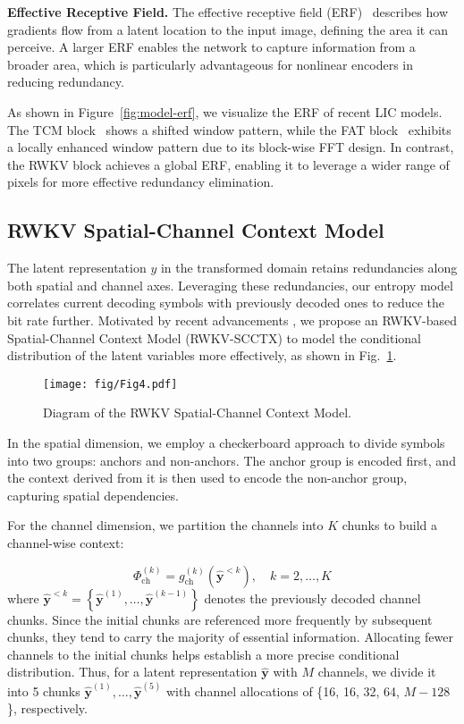 \noindent\textbf{Effective Receptive Field.} The effective receptive field (ERF)~\cite{Luo.2016.ERF} describes how gradients flow from a latent location to the input image, defining the area it can perceive. A larger ERF enables the network to capture information from a broader area, which is particularly advantageous for nonlinear encoders in reducing redundancy. 

As shown in Figure~\ref{fig:model-erf}, we visualize the ERF of recent LIC models. The TCM block~\cite{Liu.2023.TCM} shows a shifted window pattern, while the FAT block~\cite{Li.2023.FAT} exhibits a locally enhanced window pattern due to its block-wise FFT design. In contrast, the RWKV block achieves a global ERF, enabling it to leverage a wider range of pixels for more effective redundancy elimination.

\subsection{RWKV Spatial-Channel Context Model}

The latent representation \( y \) in the transformed domain retains redundancies along both spatial and channel axes. Leveraging these redundancies, our entropy model correlates current decoding symbols with previously decoded ones to reduce the bit rate further. Motivated by recent advancements \cite{He.2022.ELIC, Liu.2023.TCM}, we propose an RWKV-based Spatial-Channel Context Model (RWKV-SCCTX) to model the conditional distribution of the latent variables more effectively, as shown in Fig.~\ref{fig:entropy-model}.

\begin{figure}[t]
  \centering
  \texttt{[image: fig/Fig4.pdf]}
  \caption{Diagram of the RWKV Spatial-Channel Context Model.} 
  \label{fig:entropy-model}
\end{figure}

In the spatial dimension, we employ a checkerboard approach to divide symbols into two groups: anchors and non-anchors. The anchor group is encoded first, and the context derived from it is then used to encode the non-anchor group, capturing spatial dependencies.

For the channel dimension, we partition the channels into \( K \) chunks to build a channel-wise context:

\begin{equation}
   \Phi_{\mathrm{ch}}^{(k)} = g_{\mathrm{ch}}^{(k)}\left(\hat{\boldsymbol{y}}^{<k}\right), \quad k=2, \ldots, K 
\end{equation}
where \( \hat{\boldsymbol{y}}^{<k} = \left\{\hat{\boldsymbol{y}}^{(1)}, \ldots, \hat{\boldsymbol{y}}^{(k-1)}\right\} \) denotes the previously decoded channel chunks. Since the initial chunks are referenced more frequently by subsequent chunks, they tend to carry the majority of essential information. Allocating fewer channels to the initial chunks helps establish a more precise conditional distribution. Thus, for a latent representation \( \hat{\boldsymbol{y}} \) with \( M \) channels, we divide it into 5 chunks \( \hat{\boldsymbol{y}}^{(1)}, \ldots, \hat{\boldsymbol{y}}^{(5)} \) with channel allocations of \{16, 16, 32, 64, \( M - 128 \)\}, respectively. 

